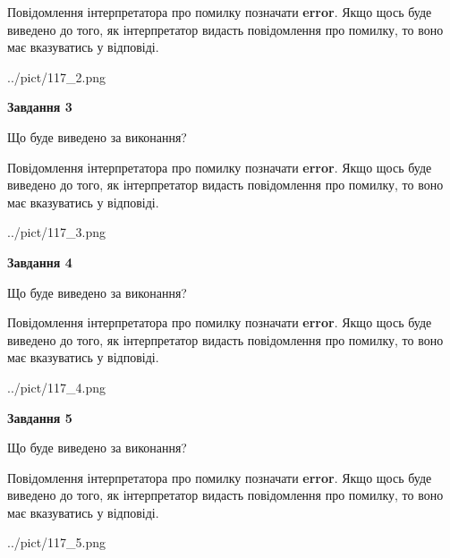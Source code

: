 \documentclass[12pt, ukrainian]{article}
\begin{document}
{\begin {large}
Повідомлення інтерпретатора про помилку позначати \textbf{error}.
Якщо щось буде виведено до того, як інтерпретатор видасть повідомлення про помилку, 
то воно має вказуватись у відповіді. \par


\begin{center}
	{../pict/117_2.png}
\end{center}
\newpage

{\begin {center}\textbf{Завдання 3}\end {center}}\par
Що буде виведено за виконання?

Повідомлення інтерпретатора про помилку позначати \textbf{error}.
Якщо щось буде виведено до того, як інтерпретатор видасть повідомлення про помилку, 
то воно має вказуватись у відповіді. \par


\begin{center}
	{../pict/117_3.png}
\end{center}
\newpage

{\begin {center}\textbf{Завдання 4}\end {center}}\par
Що буде виведено за виконання?

Повідомлення інтерпретатора про помилку позначати \textbf{error}.
Якщо щось буде виведено до того, як інтерпретатор видасть повідомлення про помилку, 
то воно має вказуватись у відповіді. \par


\begin{center}
	{../pict/117_4.png}
\end{center}
\newpage

{\begin {center}\textbf{Завдання 5}\end {center}}\par
Що буде виведено за виконання?

Повідомлення інтерпретатора про помилку позначати \textbf{error}.
Якщо щось буде виведено до того, як інтерпретатор видасть повідомлення про помилку, 
то воно має вказуватись у відповіді. \par


\begin{center}
	{../pict/117_5.png}
\end{center}
\newpage


\end{large}}
\end{document}
